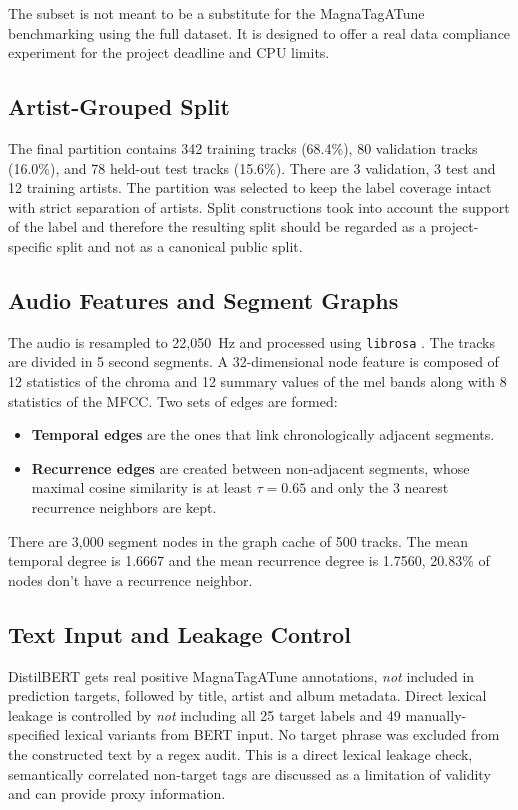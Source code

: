 \documentclass[conference]{IEEEtran}
\begin{document}
The subset is not meant to be a substitute for the MagnaTagATune benchmarking using the full dataset. It is designed to offer a real data compliance experiment for the project deadline and CPU limits.

\subsection{Artist-Grouped Split}
The final partition contains 342 training tracks (68.4\%), 80 validation tracks (16.0\%), and 78 held-out test tracks (15.6\%). There are 3 validation, 3 test and 12 training artists. The partition was selected to keep the label coverage intact with strict separation of artists. Split constructions took into account the support of the label and therefore the resulting split should be regarded as a project-specific split and not as a canonical public split.

\subsection{Audio Features and Segment Graphs}
The audio is resampled to 22,050~Hz and processed using \texttt{librosa} \cite{mcfee2015}. The tracks are divided in 5 second segments. A 32-dimensional node feature is composed of 12 statistics of the chroma and 12 summary values of the mel bands along with 8 statistics of the MFCC. Two sets of edges are formed:
\begin{itemize}
    \item \textbf{Temporal edges} are the ones that link chronologically adjacent segments.
    \item \textbf{Recurrence edges} are created between non-adjacent segments, whose maximal cosine similarity is at least $\tau=0.65$ and only the 3 nearest recurrence neighbors are kept.
\end{itemize}
There are 3,000 segment nodes in the graph cache of 500 tracks. The mean temporal degree is 1.6667 and the mean recurrence degree is 1.7560, 20.83\% of nodes don't have a recurrence neighbor.

\subsection{Text Input and Leakage Control}
DistilBERT gets real positive MagnaTagATune annotations, \emph{not} included in prediction targets, followed by title, artist and album metadata. Direct lexical leakage is controlled by \emph{not} including all 25 target labels and 49 manually-specified lexical variants from BERT input. No target phrase was excluded from the constructed text by a regex audit. This is a direct lexical leakage check, semantically correlated non-target tags are discussed as a limitation of validity and can provide proxy information.
\end{document}
